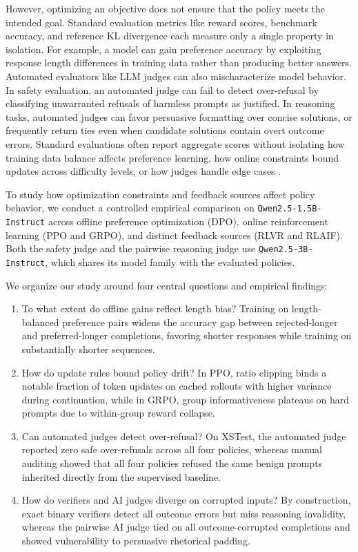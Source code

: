 \documentclass{article}
\begin{document}
However, optimizing an objective does not ensure that the policy meets the intended goal. Standard evaluation metrics like reward scores, benchmark accuracy, and reference KL divergence each measure only a single property in isolation. For example, a model can gain preference accuracy by exploiting response length differences in training data rather than producing better answers. Automated evaluators like LLM judges can also mischaracterize model behavior. In safety evaluation, an automated judge can fail to detect over-refusal by classifying unwarranted refusals of harmless prompts as justified. In reasoning tasks, automated judges can favor persuasive formatting over concise solutions, or frequently return ties even when candidate solutions contain overt outcome errors. Standard evaluations often report aggregate scores without isolating how training data balance affects preference learning, how online constraints bound updates across difficulty levels, or how judges handle edge cases \citep{anthropic2023evaluating}.

To study how optimization constraints and feedback sources affect policy behavior, we conduct a controlled empirical comparison on \texttt{Qwen2.5-1.5B-Instruct} \citep{qwen2025qwen25} across offline preference optimization (DPO), online reinforcement learning (PPO and GRPO), and distinct feedback sources (RLVR and RLAIF). Both the safety judge and the pairwise reasoning judge use \texttt{Qwen2.5-3B-Instruct}, which shares its model family with the evaluated policies.

We organize our study around four central questions and empirical findings:
\begin{enumerate}
  \item To what extent do offline gains reflect length bias? Training on length-balanced preference pairs widens the accuracy gap between rejected-longer and preferred-longer completions, favoring shorter responses while training on substantially shorter sequences.
  \item How do update rules bound policy drift? In PPO, ratio clipping binds a notable fraction of token updates on cached rollouts with higher variance during continuation, while in GRPO, group informativeness plateaus on hard prompts due to within-group reward collapse.
  \item Can automated judges detect over-refusal? On XSTest, the automated judge reported zero safe over-refusals across all four policies, whereas manual auditing showed that all four policies refused the same benign prompts inherited directly from the supervised baseline.
  \item How do verifiers and AI judges diverge on corrupted inputs? By construction, exact binary verifiers detect all outcome errors but miss reasoning invalidity, whereas the pairwise AI judge tied on all outcome-corrupted completions and showed vulnerability to persuasive rhetorical padding.
\end{enumerate}
\end{document}
